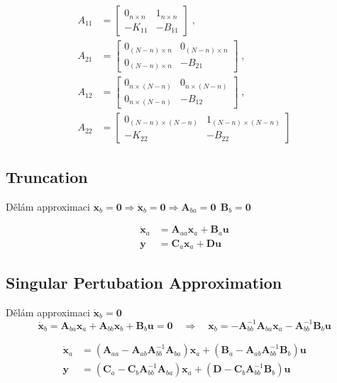\documentclass{article}
\begin{document}
\begin{align}
	A_{11}
	&=
	\begin{bmatrix}
		0_{n \times n} & 1_{n \times n} \\
		-K_{11} & -B_{11}
	\end{bmatrix}
	\;,\quad \\
	A_{21}
	&=
	\begin{bmatrix}
		0_{(N-n) \times n} & 0_{(N-n) \times n} \\
		0_{(N-n) \times n} & -B_{21}
	\end{bmatrix}
	\;,\quad \\
	A_{12}
	&=
	\begin{bmatrix}
		0_{n \times (N-n)} & 0_{n \times (N-n)} \\
		0_{n \times (N-n)} & -B_{12}
	\end{bmatrix}
	\;,\quad \\
	A_{22}
	&=
	\begin{bmatrix}
		0_{(N-n) \times (N-n)} & 1_{(N-n) \times (N-n)} \\
		-K_{22} & -B_{22}
	\end{bmatrix}
\end{align}

	\subsection{Truncation}
	Dělám approximaci $\bm{x}_b = \bm{0} \Rightarrow \bm{\dot{x}}_b = \bm{0} \Rightarrow \bm{A}_{ba} = \bm{0} \,\; \bm{B}_b = \bm{0}$

	\begin{align}
		\bm{\dot{x}}_a &= \bm{A}_{aa} \bm{x}_a + \bm{B}_a \bm{u} \\
		\bm{y} &= \bm{C}_a \bm{x}_a + \bm{D}\bm{u}
	\end{align}

	\subsection{Singular Pertubation Approximation}

	Dělám approximaci $\bm{\dot{x}}_b = \bm{0}$
	\begin{equation}
		\bm{\dot{x}}_b = \bm{A}_{ba}\bm{x}_a + \bm{A}_{bb}\bm{x}_b + \bm{B}_b\bm{u} = \bm{0}
		\quad \Rightarrow \quad
		\bm{x}_b = -\bm{A}_{bb}^{-1}\bm{A}_{ba} \bm{x}_a - \bm{A}_{bb}^{-1} \bm{B}_b \bm{u}
	\end{equation}

	\begin{align}
		\bm{\dot{x}}_a
		&=
		(\bm{A}_{aa} - \bm{A}_{ab} \bm{A}_{bb}^{-1} \bm{A}_{ba}) \bm{x}_a
		+ 
		(\bm{B}_a - \bm{A}_{ab} \bm{A}_{bb}^{-1} \bm{B}_b) \bm{u} \\
		\bm{y}
		&=
		(\bm{C}_a - \bm{C}_b \bm{A}_{bb}^{-1} \bm{A}_{ba}) \bm{x}_a
		+
		(\bm{D} - \bm{C}_b \bm{A}_{bb}^{-1} \bm{B}_b) \bm{u}
	\end{align}
\end{document}
